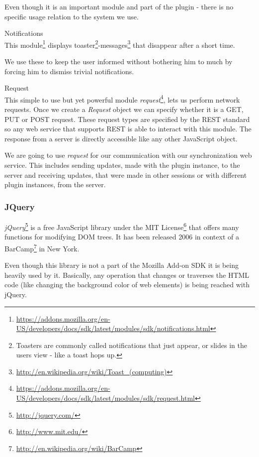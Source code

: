 \begin{description}
Even though it is an important module and part of the plugin - there is no specific usage relation to the system we use. 

\item Notifications\\
This module\footnote{\url{https://addons.mozilla.org/en-US/developers/docs/sdk/latest/modules/sdk/notifications.html}} displays toaster\footnote{Toasters are commonly called notifications that just appear, or slides in the users view - like a toast hops up.}-messages\footnote{\url{http://en.wikipedia.org/wiki/Toast_(computing)}} that disappear after a short time.

We use these to keep the user informed without bothering him to much by forcing him to dismiss trivial notifications.

\item Request\\
This simple to use but yet powerful module \emph{request}\footnote{\url{https://addons.mozilla.org/en-US/developers/docs/sdk/latest/modules/sdk/request.html}}, lets us perform network requests. Once we create a \emph{Request} object we can specify whether it is a GET, PUT or POST request. These request types are specified by the REST standard so any web service that supports REST is able to interact with this module\cite{fielding2000principled}. The response from a server is directly accessible like any other JavaScript object. 

We are going to use \emph{request} for our communication with our synchronization web service. This includes sending updates, made with the plugin instance, to the server and receiving updates, that were made in other sessions or with different plugin instances, from the server. 

\end{description}

\subsubsection*{JQuery}
\emph{jQuery}\footnote{\url{http://jquery.com/}} is a free JavaScript library under the MIT License\footnote{\url{http://www.mit.edu/}} that offers many functions for modifying DOM trees. It has been released 2006 in context of a BarCamp\footnote{\url{http://en.wikipedia.org/wiki/BarCamp}} in New York.

Even though this library is not a part of the Mozilla Add-on SDK it is being heavily used by it. Basically, any operation that changes or traverses the HTML code (like changing the background color of web elements) is being reached with jQuery.

